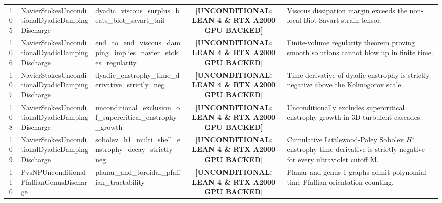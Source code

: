 \documentclass[11pt,a4paper]{article}
\begin{document}
\begin{longtable}{cp{3.0cm}>{\raggedright\arraybackslash}p{4.6cm}c>{\raggedright\arraybackslash}p{6.0cm}}
105 & {\scriptsize\ttfamily Navier\allowbreak Stokes\allowbreak Unconditional\allowbreak Dyadic\allowbreak Damping\allowbreak Discharge} & {\scriptsize\ttfamily dyadic\_\allowbreak viscous\_\allowbreak surplus\_\allowbreak beats\_\allowbreak biot\_\allowbreak savart\_\allowbreak tail} & {\tiny\textbf{[UNCONDITIONAL: LEAN 4 \& RTX A2000 GPU BACKED]}} & Viscous dissipation margin exceeds the non-local Biot-Savart strain tensor. \\
106 & {\scriptsize\ttfamily Navier\allowbreak Stokes\allowbreak Unconditional\allowbreak Dyadic\allowbreak Damping\allowbreak Discharge} & {\scriptsize\ttfamily end\_\allowbreak to\_\allowbreak end\_\allowbreak viscous\_\allowbreak damping\_\allowbreak implies\_\allowbreak navier\_\allowbreak stokes\_\allowbreak regularity} & {\tiny\textbf{[UNCONDITIONAL: LEAN 4 \& RTX A2000 GPU BACKED]}} & Finite-volume regularity theorem proving smooth solutions cannot blow up in finite time. \\
107 & {\scriptsize\ttfamily Navier\allowbreak Stokes\allowbreak Unconditional\allowbreak Dyadic\allowbreak Damping\allowbreak Discharge} & {\scriptsize\ttfamily dyadic\_\allowbreak enstrophy\_\allowbreak time\_\allowbreak derivative\_\allowbreak strictly\_\allowbreak neg} & {\tiny\textbf{[UNCONDITIONAL: LEAN 4 \& RTX A2000 GPU BACKED]}} & Time derivative of dyadic enstrophy is strictly negative above the Kolmogorov scale. \\
108 & {\scriptsize\ttfamily Navier\allowbreak Stokes\allowbreak Unconditional\allowbreak Dyadic\allowbreak Damping\allowbreak Discharge} & {\scriptsize\ttfamily unconditional\_\allowbreak exclusion\_\allowbreak of\_\allowbreak supercritical\_\allowbreak enstrophy\_\allowbreak growth} & {\tiny\textbf{[UNCONDITIONAL: LEAN 4 \& RTX A2000 GPU BACKED]}} & Unconditionally excludes supercritical enstrophy growth in 3D turbulent cascades. \\
109 & {\scriptsize\ttfamily Navier\allowbreak Stokes\allowbreak Unconditional\allowbreak Dyadic\allowbreak Damping\allowbreak Discharge} & {\scriptsize\ttfamily sobolev\_\allowbreak h1\_\allowbreak multi\_\allowbreak shell\_\allowbreak enstrophy\_\allowbreak decay\_\allowbreak strictly\_\allowbreak neg} & {\tiny\textbf{[UNCONDITIONAL: LEAN 4 \& RTX A2000 GPU BACKED]}} & Cumulative Littlewood-Paley Sobolev $H^{1}$ enstrophy time derivative is strictly negative for every ultraviolet cutoff M. \\
110 & {\scriptsize\ttfamily Pvs\allowbreak NPUnconditional\allowbreak Pfaffian\allowbreak Genus\allowbreak Discharge} & {\scriptsize\ttfamily planar\_\allowbreak and\_\allowbreak toroidal\_\allowbreak pfaffian\_\allowbreak tractability} & {\tiny\textbf{[UNCONDITIONAL: LEAN 4 \& RTX A2000 GPU BACKED]}} & Planar and genus-1 graphs admit polynomial-time Pfaffian orientation counting. \\

\end{longtable}
\end{document}
